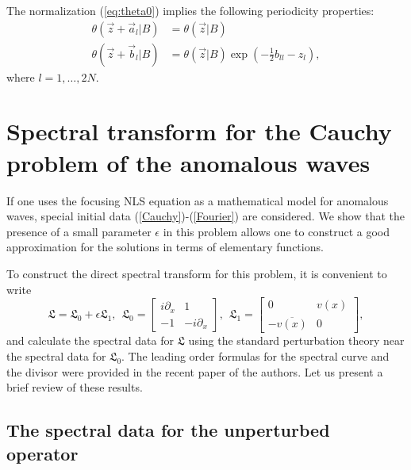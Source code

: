 \documentclass[12pt]{article}
\newcommand{\LG}{\mathfrak L}
\newcommand{\eps}{{\epsilon}}
\begin{document}
The normalization (\ref{eq:theta0}) implies the following periodicity properties:
\begin{align}
\theta\left(\vec z+ \vec a_l |B \right)&=\theta\left(\vec z |B \right) \nonumber\\
\label{eq:theta-per} 
\theta\left(\vec z+ \vec b_l |B \right)&=\theta\left(\vec z |B \right) \exp\left(-\frac{1}{2} b_{ll}- z_l \right),
\end{align}
where $l=1,\ldots,2N$.

\section{Spectral transform for the Cauchy problem of  the anomalous waves}
\label{sec:sec4}

If one uses the focusing NLS equation as a mathematical model for anomalous waves, special initial data (\ref{Cauchy})-(\ref{Fourier})  are considered. We show that the presence of a small parameter $\epsilon$ in this problem allows one to construct a good approximation for the solutions in terms of elementary functions.

To construct the direct spectral transform for this problem, it is convenient to write
$$
\LG=\LG_0+\eps \LG_1, \ \ \LG_0 = \left[ \begin {array}{cc} i\partial_x & 1 \\ -1  & -i\partial_x \end {array}\right], \ \ 
\LG_1 = \left[ \begin {array}{cc} 0 & v(x) \\ -\overline{v(x)}  & 0 \end {array}\right],
$$
and calculate the spectral data for $\LG$ using the standard perturbation theory near the spectral data for $\LG_0$. The leading order formulas for the spectral curve and the divisor were provided in the recent paper \cite{GS1} of the authors. Let us present a brief review of these results.

\subsection{The spectral data for the unperturbed operator}
\label{sec:sec4.1}
\end{document}
